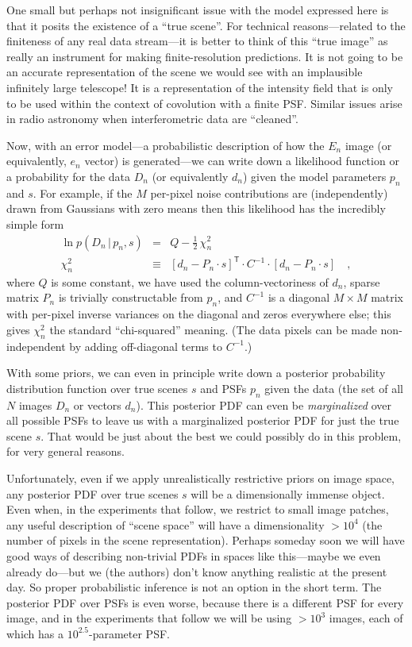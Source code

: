 \documentclass[12pt,preprint]{aastex}
\newcommand{\given}{\,|\,}
\newcommand{\transpose}[1]{{#1}^{\mathsf{T}}}
\newcommand{\data}{D}
\begin{document}
One small but perhaps not insignificant issue with the model expressed
here is that it posits the existence of a ``true scene''.  For
technical reasons---related to the finiteness of any real data
stream---it is better to think of this ``true image'' as really an
instrument for making finite-resolution predictions.  It is not going
to be an accurate representation of the scene we would see with an
implausible infinitely large telescope!  It is a representation of the
intensity field that is only to be used within the context of
covolution with a finite PSF.  Similar issues arise in radio astronomy
when interferometric data are ``cleaned''.

Now, with an error model---a probabilistic description of how the
$E_n$ image (or equivalently, $e_n$ vector) is generated---we can
write down a likelihood function or a probability for the data $\data_n$
(or equivalently $d_n$) given the model parameters $p_n$ and $s$.  For
example, if the $M$ per-pixel noise contributions are (independently)
drawn from Gaussians with zero means then this likelihood has the
incredibly simple form
\begin{eqnarray}\displaystyle
\ln p(\data_n\given p_n, s) &=& Q - \frac{1}{2}\,\chi^2_n
\\
\chi^2_n &\equiv& \transpose{[d_n - P_n \cdot s]} \cdot C^{-1} \cdot [d_n - P_n \cdot s]
\quad ,
\end{eqnarray}
where $Q$ is some constant, we have used the column-vectoriness of
$d_n$, sparse matrix $P_n$ is trivially constructable from $p_n$, and
$C^{-1}$ is a diagonal $M\times M$ matrix with per-pixel inverse
variances on the diagonal and zeros everywhere else; this gives
$\chi^2_n$ the standard ``chi-squared'' meaning.  (The data pixels can
be made non-independent by adding off-diagonal terms to $C^{-1}$.)

With some priors, we can even in principle write down a posterior
probability distribution function over true scenes $s$ and PSFs $p_n$
given the data (the set of all $N$ images $\data_n$ or vectors $d_n$).
This posterior PDF can even be \emph{marginalized} over all possible
PSFs to leave us with a marginalized posterior PDF for just the true
scene $s$.  That would be just about the best we could possibly do in
this problem, for very general reasons.

Unfortunately, even if we apply unrealistically restrictive priors on
image space, any posterior PDF over true scenes $s$ will be a
dimensionally immense object.  Even when, in the experiments that
follow, we restrict to small image patches, any useful description of
``scene space'' will have a dimensionality $>10^4$ (the number of
pixels in the scene representation).  Perhaps someday soon we will
have good ways of describing non-trivial PDFs in spaces like
this---maybe we even already do---but we (the authors) don't know
anything realistic at the present day.  So proper probabilistic
inference is not an option in the short term.  The posterior PDF over
PSFs is even worse, because there is a different PSF for every image,
and in the experiments that follow we will be using $>10^3$ images,
each of which has a $10^{2.5}$-parameter PSF.
\end{document}
